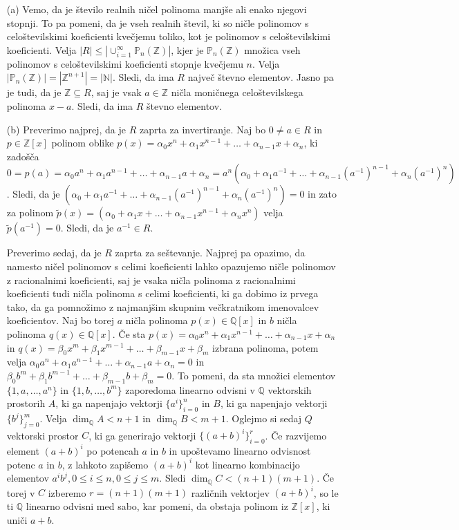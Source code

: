 \documentclass[a4paper, 12pt]{article}
\newcommand{\N}{\mathbb{N}}
\newcommand{\Z}{\mathbb{Z}}
\newcommand{\Q}{\mathbb{Q}}
\begin{document}
\begin{enumerate}
\item[(a)] Vemo, da je število realnih ničel polinoma manjše ali enako njegovi stopnji. To pa pomeni, da je vseh realnih števil, ki so ničle polinomov s celoštevilskimi koeficienti kvečjemu toliko, kot je polinomov s celoštevilskimi koeficienti. Velja $|R| \le |\cup_{i=1}^\infty \mathbb{P}_n(\Z)|$, kjer je $\mathbb{P}_n(\Z)$ množica vseh polinomov s celoštevilskimi koeficienti stopnje kvečjemu $n$. Velja $|\mathbb{P}_n(\Z)| = |\Z^{n+1}| = |\N|$. Sledi, da ima  $R$ največ števno elementov. Jasno pa je tudi, da je $\Z \subseteq R$, saj je vsak $a\in \Z$ ničla moničnega celoštevilskega polinoma $x-a$. Sledi, da ima $R$ števno elementov.

\item[(b)] Preverimo najprej, da je $R$ zaprta za invertiranje. Naj bo $0\neq a\in R$ in $p\in \Z[x]$ polinom oblike $p(x) = \alpha_0 x^n + \alpha_1 x^{n-1} + \dots  + \alpha_{n-1}x +\alpha_n$, ki zadošča $0=p(a) =  \alpha_0 a^n + \alpha_1 a^{n-1} + \dots  + \alpha_{n-1}a +\alpha_n = a^n (\alpha_0 + \alpha_1 a^{-1} + \dots + \alpha_{n-1} (a^{-1})^{n-1} + \alpha_n (a^{-1})^{n})$. Sledi, da je $(\alpha_0 + \alpha_1 a^{-1} + \dots + \alpha_{n-1} (a^{-1})^{n-1} + \alpha_n (a^{-1})^{n}) = 0$ in zato za polinom $\tilde{p}(x) = (\alpha_0 + \alpha_1 x + \dots + \alpha_{n-1} x^{n-1} + \alpha_n x^{n})$ velja $\tilde{p}(a^{-1}) = 0$. Sledi, da je $a^{-1}\in R$.

Preverimo sedaj, da je $R$ zaprta za seštevanje. Najprej pa opazimo, da namesto ničel polinomov s celimi koeficienti lahko opazujemo ničle polinomov z racionalnimi koeficienti, saj je vsaka ničla polinoma z racionalnimi koeficienti tudi ničla polinoma s celimi koeficienti, ki ga dobimo iz prvega tako, da ga pomnožimo z najmanjšim skupnim večkratnikom imenovalcev koeficientov. Naj bo torej $a$ ničla polinoma $p(x) \in \Q[x]$ in $b$ ničla polinoma $q(x)\in \Q[x]$. Če sta $p(x) = \alpha_0 x^n + \alpha_1 x^{n-1} + \dots + \alpha_{n-1}x + \alpha_n$ in $q(x) = \beta_0 x^m + \beta_1 x^{m-1} + \dots + \beta_{m-1}x + \beta_m$ izbrana polinoma, potem velja $ \alpha_0 a^n + \alpha_1 a^{n-1} + \dots + \alpha_{n-1}a + \alpha_n = 0$  in $\beta_0 b^m + \beta_1 b^{m-1} + \dots + \beta_{m-1}b + \beta_m=0$. To pomeni, da sta množici elementov $\{1,a,\dots, a^n\}$ in $\{1,b,\dots,b^m\}$ zaporedoma linearno odvisni v $\Q$ vektorskih prostorih $A$, ki ga napenjajo vektorji $\{a^i\}_{i=0}^n$ in $B$, ki ga napenjajo vektorji $\{b^j\}_{j=0}^m$. Velja $\dim_{\Q} A < n+1$ in $\dim_{ \Q} B < m+1$. Oglejmo si sedaj $Q$ vektorski prostor $C$, ki ga generirajo vektorji $\{(a+b)^i\}_{i=0}^r$. Če razvijemo element $(a+b)^i$ po potencah $a$ in $b$ in upoštevamo linearno odvisnost potenc $a$ in $b$, z lahkoto zapišemo $(a+b)^i$ kot linearno kombinacijo elementov $a^i b^j, 0\le i \le n, 0 \le j \le m$. Sledi $\dim_{\Q}C < (n+1)(m+1)$. Če torej v $C$ izberemo $r=(n+1)(m+1)$ različnih vektorjev $(a+b)^i$, so le ti $\Q$ linearno odvisni med sabo, kar pomeni, da obstaja polinom iz $\Z[x]$, ki uniči $a+b$.


\end{enumerate}
\end{document}
